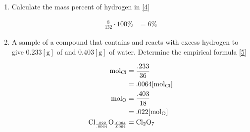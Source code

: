 \documentclass[12pt]{article}
\begin{document}
\begin{enumerate}
  \item Calculate the mass percent of hydrogen in  \eqref{4}

    \begin{equation}
      \begin{split}
      \frac{8}{132} \cdot 100\% & = 6\%
    \end{split}
      \label{4}
    \end{equation}

  \item A sample of a compound that contains  and  reacts with excess hydrogen to give $0.233[\si{\gram}]$ of  and $0.403[\si{\gram}]$ of water. Determine the empirical formula \eqref{5}

    \begin{equation}
      \begin{split}
        \si{\mole}_{\ce{Cl}} & = \frac{.233}{36} \\
        & = .0064[\si{\mole}_{\ce{Cl}}] \\
        \si{\mole}_{\ce{O}} & = \frac{.403}{18} \\
      & = .022[\si{\mole}_{\ce{O}}] \\
      \ce{Cl}_{\frac{.022}{.0064}}\ce{O}_{\frac{.0064}{.0064}} & = \ce{Cl2O7}
      \end{split}
      \label{5}
    \end{equation}

\end{enumerate}
\end{document}
